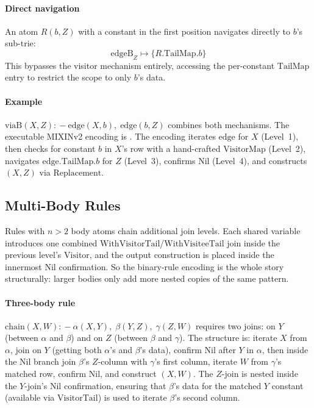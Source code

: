 \paragraph{Direct navigation}
An atom $R(b, Z)$ with a constant in the first position
navigates directly to $b$'s sub-trie:
\[
  \mathrm{edgeB}_Z \mapsto \{R.\mathrm{TailMap}.b\}
\]
This bypasses the visitor mechanism entirely, accessing
the per-constant $\mathrm{TailMap}$ entry to restrict the
scope to only $b$'s data.

\paragraph{Example}
$\mathrm{viaB}(X, Z) \mathrel{{:}\!{-}} \mathrm{edge}(X, b),\; \mathrm{edge}(b, Z)$
combines both mechanisms.
The executable MIXINv2 encoding is
.
The encoding iterates $\mathrm{edge}$ for $X$ (Level~1),
then checks for constant $b$ in $X$'s row with a
hand-crafted $\mathrm{VisitorMap}$ (Level~2), navigates
$\mathrm{edge}.\mathrm{TailMap}.b$ for $Z$ (Level~3),
confirms $\mathrm{Nil}$ (Level~4), and constructs $(X, Z)$
via $\mathrm{Replacement}$.

\subsection{Multi-Body Rules}
\label{sec:encoding-multi}

Rules with $n > 2$ body atoms chain additional join levels.
Each shared variable introduces one combined
$\mathrm{WithVisitorTail}$/$\mathrm{WithVisiteeTail}$ join
inside the previous level's $\mathrm{Visitor}$,
and the output construction is placed inside the innermost
$\mathrm{Nil}$ confirmation.
So the binary-rule encoding is the whole story structurally:
larger bodies only add more nested copies of the same pattern.

\paragraph{Three-body rule}
$\mathrm{chain}(X, W) \mathrel{{:}\!{-}} \alpha(X, Y),\; \beta(Y, Z),\; \gamma(Z, W)$
requires two joins: on $Y$ (between $\alpha$ and $\beta$)
and on $Z$ (between $\beta$ and $\gamma$).
The structure is: iterate $X$ from $\alpha$, join on $Y$
(getting both $\alpha$'s and $\beta$'s data), confirm
$\mathrm{Nil}$ after $Y$ in $\alpha$, then inside the
$\mathrm{Nil}$ branch join $\beta$'s $Z$-column with
$\gamma$'s first column, iterate $W$ from $\gamma$'s
matched row, confirm $\mathrm{Nil}$, and construct
$(X, W)$.
The $Z$-join is nested inside the $Y$-join's
$\mathrm{Nil}$ confirmation, ensuring that $\beta$'s data
for the matched $Y$ constant (available via
$\mathrm{VisitorTail}$) is used to iterate $\beta$'s
second column.

